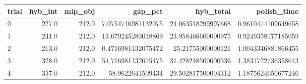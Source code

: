 \begin{tabular}{lrrrrr}
\hline
trial & hyb_int & mip_obj & gap_pct & hyb_total & polish_time \\ \hline
0 & 227.0 & 212.0 & 7.0754716981132075 & 24.063518299997668 & 0.9610474109649658 \\
1 & 241.0 & 212.0 & 13.679245283018869 & 23.958466600000975 & 0.9249358177185059 \\
2 & 213.0 & 212.0 & 0.4716981132075472 & 25.21755000000121 & 1.0043346881866455 \\
3 & 328.0 & 212.0 & 54.716981132075475 & 31.428248500000336 & 1.3831722736358643 \\
4 & 337.0 & 212.0 & 58.9622641509434 & 29.502817500004312 & 1.1875624656677246 \\
\hline
\end{tabular}
